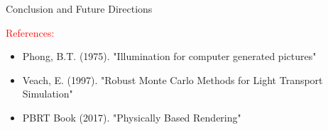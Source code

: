 \documentclass[aspectratio=169]{beamer}
\begin{document}
\begin{frame}{Conclusion and Future Directions}
    \vspace{0.5cm}
    \begin{center}
        \textcolor{red}{\large References:}
        \begin{itemize}
            \item Phong, B.T. (1975). "Illumination for computer generated pictures"
            \item Veach, E. (1997). "Robust Monte Carlo Methods for Light Transport Simulation"
            \item PBRT Book (2017). "Physically Based Rendering"
        \end{itemize}
    \end{center}
\end{frame}
\end{document}
